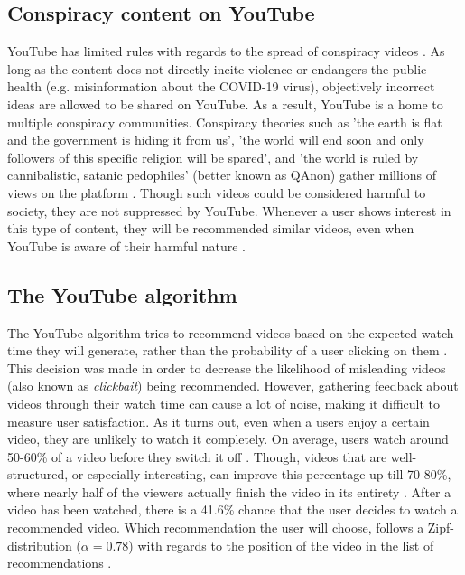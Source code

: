 \documentclass[../main.tex]{subfiles}
\begin{document}
\subsection{Conspiracy content on YouTube}
YouTube has limited rules with regards to the spread of conspiracy videos \citep{youtube_2021}. As long
as the content does not directly incite violence or endangers the public health (e.g. misinformation
about the COVID-19 virus), objectively incorrect ideas are allowed to be shared on YouTube. As a result,
YouTube is a home to multiple conspiracy communities. Conspiracy theories such as 'the earth is flat and
the government is hiding it from us', 'the world will end soon and only followers of this specific
religion will be spared', and 'the world is ruled by cannibalistic, satanic pedophiles' (better known as
QAnon) gather millions of views on the platform \citep{paolillo2018flat, miller2021characterizing}.
Though such videos could be considered harmful to society, they are not suppressed by YouTube. Whenever
a user shows interest in this type of content, they will be recommended similar videos, even when
YouTube is aware of their harmful nature \citep{ledwich2019algorithmic, maack_2019}.

\subsection{The YouTube algorithm}
The YouTube algorithm tries to recommend videos based on the expected watch time they will generate,
rather than the probability of a user clicking on them \citep{covington2016deep}. This decision was made
in order to decrease the likelihood of misleading videos (also known as \textit{clickbait}) being
recommended. However, gathering feedback about videos through their watch time can cause a lot of noise,
making it difficult to measure user satisfaction. As it turns out, even when a users enjoy a certain
video, they are unlikely to watch it completely. On average, users watch around 50-60\% of a video
before they switch it off \citep{park2016data}. Though, videos that are well-structured, or especially
interesting, can improve this percentage up till 70-80\%, where nearly half of the viewers actually
finish the video in its entirety \citep{lang_2018}. After a video has been watched, there is a 41.6\%
chance that the user decides to watch a recommended video. Which recommendation the user will choose,
follows a Zipf-distribution ($\alpha = 0.78$) with regards to the position of the video in the list of
recommendations \citep{zhou2010impact}. 
\end{document}
